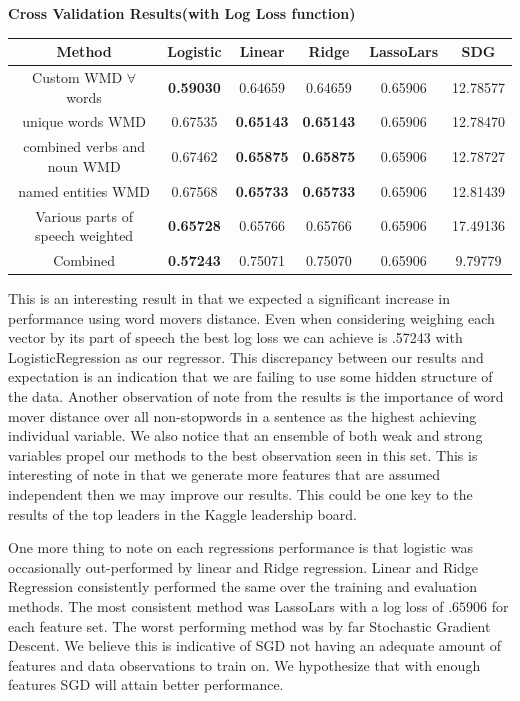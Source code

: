 \documentclass{article} %
\begin{document}
\begin{center}
\textbf{Cross Validation Results(with Log Loss function)}

	\begin{tabular}{|c|c|c|c|c|c|} \hline
	Method & Logistic & Linear & Ridge & LassoLars & SDG \\ \hline
	Custom WMD $\forall$ words & \textbf{0.59030} & 0.64659 & 0.64659 & 0.65906 & 12.78577 \\ \hline
	unique words WMD & 0.67535 & \textbf{0.65143} & \textbf{0.65143} & 0.65906 & 12.78470 \\ \hline
	combined verbs and noun WMD & 0.67462 & \textbf{0.65875} & \textbf{0.65875} & 0.65906 & 12.78727 \\ \hline
	named entities WMD & 0.67568 & \textbf{0.65733} & \textbf{0.65733} & 0.65906 & 12.81439 \\ \hline
	Various parts of speech weighted & \textbf{0.65728} & 0.65766 & 0.65766 & 0.65906 & 17.49136\\ \hline
	Combined & \textbf{0.57243} & 0.75071 & 0.75070 & 0.65906 & 9.79779 \\ \hline
	\end{tabular}
\end{center}
This is an interesting result in that we expected a significant increase in performance using word movers distance. Even when considering weighing each vector by its part of speech the best log loss we can achieve is .57243 with LogisticRegression as our regressor. This discrepancy between our results and expectation is an indication that we are failing to use some hidden structure of the data. Another observation of note from the results is the importance of word mover distance over all non-stopwords in a sentence as the highest achieving individual variable. We also notice that an ensemble of both weak and strong variables propel our methods to the best observation seen in this set. This is interesting of note in that we generate more features that are assumed independent then we may improve our results. This could be one key to the results of the top leaders in the Kaggle leadership board.

One more thing to note on each regressions performance is that logistic was occasionally out-performed by linear and Ridge regression. Linear and Ridge Regression consistently performed the same over the training and evaluation methods. The most consistent method was LassoLars with a log loss of $.65906$ for each feature set. The worst performing method was by far Stochastic Gradient Descent. We believe this is indicative of SGD not having an adequate amount of features and data observations to train on. We hypothesize that with enough features SGD will attain better performance.
\end{document}
